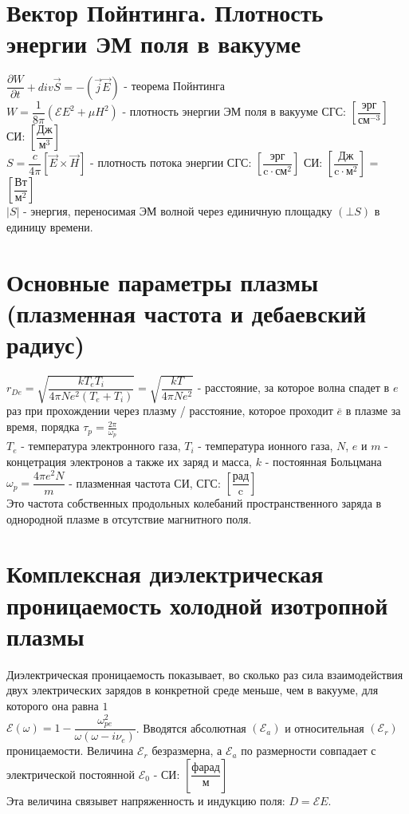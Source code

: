 \begin{multicols*}{2}
		\section{Вектор Пойнтинга. Плотность энергии ЭМ поля в вакууме}
		$\dfrac{\partial W}{\partial t} + div \vec{S} = - (\vec{j}  \vec{E})$ - теорема Пойнтинга\\
		$W = \dfrac{1}{8\pi} (\mathcal{E}E^2 + \mu H^2)$ - плотность энергии ЭМ поля в вакууме \quad СГС: $\left[\dfrac{\text{эрг}}{\text{см}^{-3}}\right]$ \quad СИ: $\left[\dfrac{\text{Дж}}{\text{м}^3}\right]$\\
		$S = \dfrac{c}{4\pi} \left[\vec{E}\times \vec{H}\right]$ - плотность потока энергии \quad СГС: $\left[\dfrac{\text{эрг}}{\text{c}\cdot\text{см}^2}\right]$ \quad СИ: $\left[\dfrac{\text{Дж}}{\text{c}\cdot \text{м}^2}\right]$ = $\left[\dfrac{\text{Вт}}{\text{м}^2}\right]$\\
		$\left\lvert S\right\rvert$ - энергия, переносимая ЭМ волной через единичную площадку $(\bot S)$ в единицу времени.

		\section{Основные параметры плазмы (плазменная частота и дебаевский радиус)}
		$r_{De} = \sqrt{\dfrac{k T_e T_i}{4\pi N e^2(T_e + T_i)}} = \sqrt{\dfrac{k T}{4\pi N e^2}}$ - расстояние, за которое волна спадет в $e$ раз при прохождении через плазму / расстояние, которое проходит $\bar{e}$ в плазме за время, порядка $\tau_p = \frac{2\pi}{\omega_p}$\\
		$T_e$ - температура электронного газа, $T_i$ - температура ионного газа, $N$, $e$ и $m$ - концетрация электронов а также их заряд и масса, $k$ - постоянная Больцмана\\
		$\omega_p = \dfrac{4\pi e^2 N}{m}$ - плазменная частота \quad СИ, СГС: $\left[\dfrac{\text{рад}}{\text{c}}\right]$\\
		Это частота собственных продольных колебаний пространственного заряда в однородной плазме в отсутствие магнитного поля.

		\section{Комплексная диэлектрическая проницаемость холодной изотропной плазмы}
		Диэлектрическая проницаемость показывает, во сколько раз сила взаимодействия двух электрических зарядов в конкретной среде меньше, чем в вакууме, для которого она равна $1$\\
		$\mathcal{E} (\omega) = 1 - \dfrac{\omega_{pe}^2}{\omega(\omega - i\nu_e)}$.
		Вводятся абсолютная $(\mathcal{E}_a)$ и относительная $(\mathcal{E}_r)$ проницаемости. Величина $\mathcal{E} _{r}$ безразмерна, а ${\displaystyle \mathcal{E} _{a}}$ по размерности совпадает с электрической постоянной $\mathcal{E}_{0}$ - СИ: $\left[\dfrac{\text{фарад}}{\text{м}}\right]$\\
		Эта величина связывет напряженность и индукцию поля: $D = \mathcal{E} E $.


	\end{multicols*}

